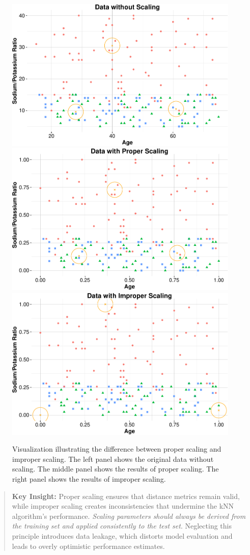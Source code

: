 \documentclass[
]{book}
\theoremstyle{definition}
\theoremstyle{definition}
\theoremstyle{definition}
\theoremstyle{definition}
\theoremstyle{remark}
\begin{document}
\begin{figure}

{\centering \includegraphics[width=0.5\linewidth]{knn_files/figure-latex/ex-proper-scaling-1} \includegraphics[width=0.5\linewidth]{knn_files/figure-latex/ex-proper-scaling-2} \includegraphics[width=0.5\linewidth]{knn_files/figure-latex/ex-proper-scaling-3} 

}

\caption{Visualization illustrating the difference between proper scaling and improper scaling. The left panel shows the original data without scaling. The middle panel shows the results of proper scaling. The right panel shows the results of improper scaling.}\label{fig:ex-proper-scaling}
\end{figure}

\begin{quote}
\textbf{Key Insight:} Proper scaling ensures that distance metrics remain valid, while improper scaling creates inconsistencies that undermine the kNN algorithm's performance. \emph{Scaling parameters should always be derived from the training set and applied consistently to the test set}. Neglecting this principle introduces data leakage, which distorts model evaluation and leads to overly optimistic performance estimates.
\end{quote}
\end{document}
